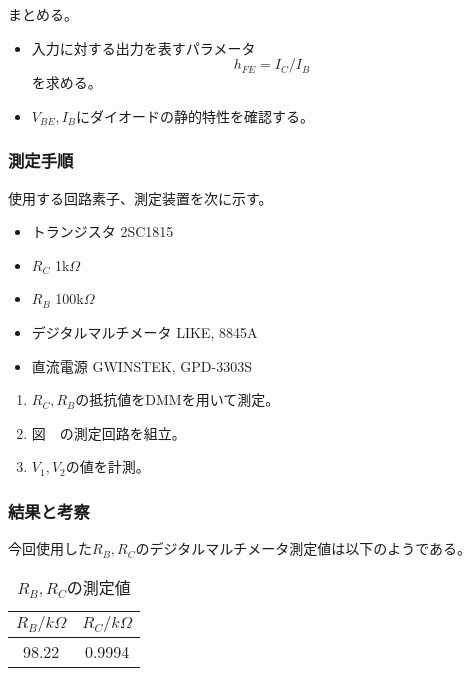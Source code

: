 \documentclass[11pt,a4j,titlepage]{jsarticle}
\begin{document}
   \newpage
   
   まとめる。
   \begin{itemize}
    \item 入力に対する出力を表すパラメータ
	  \begin{equation}
           h_{FE} = I_C / I_B
          \end{equation}
          を求める。
    \item $V_{BE},I_B$にダイオードの静的特性を確認する。
   \end{itemize}

  
  \newpage
  
   \subsubsection{測定手順}
  使用する回路素子、測定装置を次に示す。
  \begin{itemize}
   \item トランジスタ 2SC1815
   \item $R_C$ 1k$\Omega$
   \item $R_B$ 100k$\Omega$
   \item デジタルマルチメータ LIKE, 8845A
   \item 直流電源 GWINSTEK, GPD-3303S
  \end{itemize}
  
  \begin{enumerate}
   \item $R_C,R_B$の抵抗値をDMMを用いて測定。
   \item 図\ \ の測定回路を組立。
   \item $V_1,V_2$の値を計測。
  \end{enumerate}
  
  
  
   \subsubsection{結果と考察}

   今回使用した$R_B,R_C$のデジタルマルチメータ測定値は以下のようである。
 
 \begin{table}[htb]
  \begin{center}
    \caption{$R_B,R_C$の測定値}
    \begin{tabular}{cc} \toprule
$R_B/k\Omega$ & $R_C/k\Omega$ \\ \midrule
98.22 &	0.9994\\ \bottomrule
    \end{tabular}
    \label{tab:price}
  \end{center}
\end{table}
 
\end{document}

